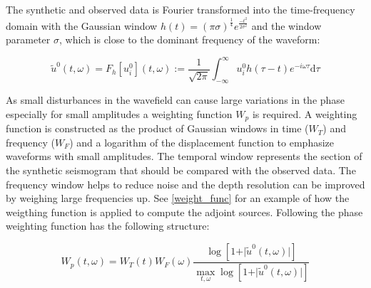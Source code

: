 The synthetic and observed data is Fourier transformed into the time-frequency domain with the Gaussian window
$h(t) = (\pi \sigma)^{\frac{1}{4}} e^{\frac{-t^2}{2 \sigma^2}}$
and the window parameter $\sigma$, which is close to the dominant frequency of the waveform:

\begin{equation}
\tilde{u}^0 (t, \omega) = F_h[u_i^0](t,\omega) := \frac{1}{\sqrt{2\pi}} \int_{-\infty}^{\infty} u_i^0 h(\tau - t) e^{-i \omega \tau} \mathrm{d}\tau
\end{equation}


As small disturbances in the wavefield can cause large variations in the phase especially for small amplitudes
a weighting function $W_p$ is required.
%
A weighting function is constructed as the product of Gaussian windows in time ($W_T$) and frequency ($W_F$) 
and a logarithm of the displacement function to emphasize waveforms with small amplitudes.
The temporal window represents the section of the synthetic seismogram that should be compared with the 
observed data. 
The frequency window helps to reduce noise and the depth resolution can be improved by weighing large frequencies up.
See \autoref{weight_func} for an example of how the weigthing function is applied to compute the adjoint sources.
Following \citealp{Fichtner2009} the phase weighting function has the following structure:

\begin{equation}
W_p(t, \omega) = W_T(t) W_F(\omega) \frac{  \log[1 + \vert \tilde{u}^0 (t, \omega) \vert ] }
{\max_{t,\omega} \log  [1 + \vert \tilde{u}^0 (t, \omega) \vert ]}
\end{equation}





